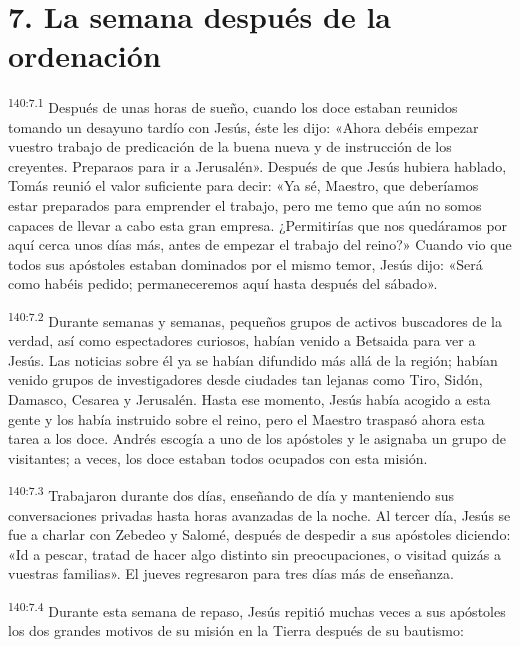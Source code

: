 \section*{7. La semana después de la ordenación}
\par
\textsuperscript{140:7.1} Después de unas horas de sueño, cuando los doce estaban reunidos tomando un desayuno tardío con Jesús, éste les dijo: «Ahora debéis empezar vuestro trabajo de predicación de la buena nueva y de instrucción de los creyentes. Preparaos para ir a Jerusalén». Después de que Jesús hubiera hablado, Tomás reunió el valor suficiente para decir: «Ya sé, Maestro, que deberíamos estar preparados para emprender el trabajo, pero me temo que aún no somos capaces de llevar a cabo esta gran empresa. ¿Permitirías que nos quedáramos por aquí cerca unos días más, antes de empezar el trabajo del reino?» Cuando vio que todos sus apóstoles estaban dominados por el mismo temor, Jesús dijo: «Será como habéis pedido; permaneceremos aquí hasta después del sábado».

\par
\textsuperscript{140:7.2} Durante semanas y semanas, pequeños grupos de activos buscadores de la verdad, así como espectadores curiosos, habían venido a Betsaida para ver a Jesús. Las noticias sobre él ya se habían difundido más allá de la región; habían venido grupos de investigadores desde ciudades tan lejanas como Tiro, Sidón, Damasco, Cesarea y Jerusalén. Hasta ese momento, Jesús había acogido a esta gente y los había instruido sobre el reino, pero el Maestro traspasó ahora esta tarea a los doce. Andrés escogía a uno de los apóstoles y le asignaba un grupo de visitantes; a veces, los doce estaban todos ocupados con esta misión.

\par
\textsuperscript{140:7.3} Trabajaron durante dos días, enseñando de día y manteniendo sus conversaciones privadas hasta horas avanzadas de la noche. Al tercer día, Jesús se fue a charlar con Zebedeo y Salomé, después de despedir a sus apóstoles diciendo: «Id a pescar, tratad de hacer algo distinto sin preocupaciones, o visitad quizás a vuestras familias». El jueves regresaron para tres días más de enseñanza.

\par
\textsuperscript{140:7.4} Durante esta semana de repaso, Jesús repitió muchas veces a sus apóstoles los dos grandes motivos de su misión en la Tierra después de su bautismo:

